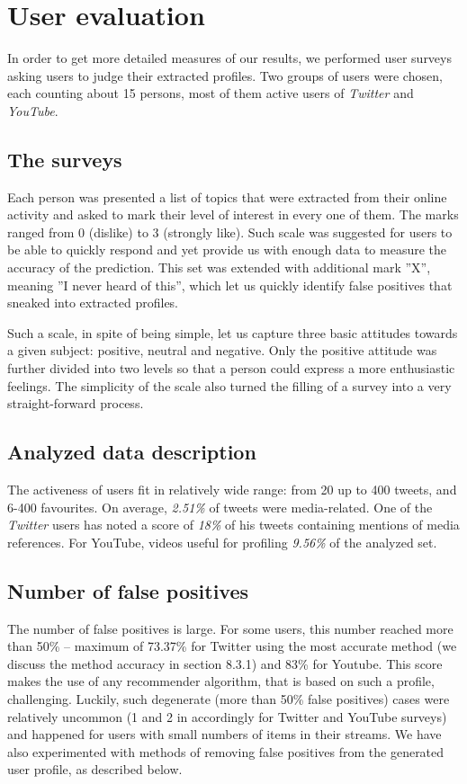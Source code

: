 \section{User evaluation}
In order to get more detailed measures of our results, we performed user surveys
asking users to judge their extracted profiles. Two groups of users were chosen,
each counting about 15 persons, most of them active users of \textit{Twitter} and \textit{YouTube}.

\subsection{The surveys}

Each person was presented a list of topics that were extracted from their online
activity and asked to mark their level of interest in every one of
them. The marks ranged from 0 (dislike) to 3 (strongly like).
Such scale was suggested for users to be able to quickly respond
and yet provide us with enough data to measure the accuracy of the prediction.
This set was extended with additional mark ''X'', meaning
''I never heard of this'', which let us quickly identify false positives that
sneaked into extracted profiles.

Such a scale, in spite of being simple, let us capture three basic attitudes
towards a given subject: positive, neutral and negative. Only the positive
attitude was further divided into two levels so that a person could express a
more enthusiastic feelings. The simplicity of the scale also turned the filling
of a survey into a very straight-forward process.

\subsection{Analyzed data description}
The activeness of users fit in relatively wide range: from 20 up to 400 tweets,
and 6-400 favourites. On average, \textit{2.51\%} of tweets were media-related.
One of the \textit{Twitter} users has noted a score of \textit{18\%} of his
tweets containing mentions of media references. For YouTube, videos useful
for profiling \textit{9.56\%} of the analyzed set.

\subsection{Number of false positives}
The number of false positives is large. For some users, this
number reached more than 50\% -- maximum of 73.37\% for Twitter using the most accurate method (we discuss
the method accuracy in section 8.3.1) and 83\% for Youtube. This score makes the use of any recommender
algorithm, that is based on such a profile, challenging. Luckily, such degenerate
(more than 50\% false positives) cases were relatively uncommon (1 and 2 in accordingly for
Twitter and YouTube surveys) and happened for users with small numbers of items in their streams.
We have also experimented with methods of removing false positives from the generated user profile,
as described below.

